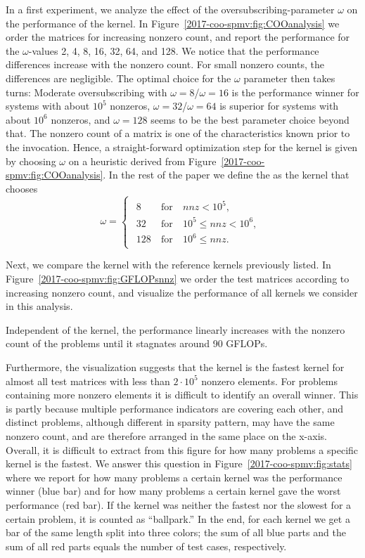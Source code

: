 In a first experiment, we analyze the effect of the oversubscribing-parameter $\omega$ 
on the performance of the \coo kernel.
In Figure~\ref{2017-coo-spmv:fig:COOanalysis} we order the matrices for increasing nonzero count, 
and report the performance for the $\omega$-values 2, 4, 8, 16, 32, 64, and 128.
We notice that the performance differences increase with the
nonzero count. For small nonzero counts, the differences are negligible. 
The optimal choice for the $\omega$ parameter then takes turns: 
Moderate oversubscribing with $\omega=8$/$\omega=16$ 
is the performance winner for systems with about $10^5$ nonzeros,
$\omega=32$/$\omega=64$ is superior for systems with about $10^6$ nonzeros,
and $\omega=128$ seems to be the best parameter choice beyond that.
The nonzero count of a matrix is one of the characteristics known prior
to the \spmv invocation. 
Hence, a straight-forward optimization step for the \coo kernel is given 
by choosing $\omega$ on a heuristic derived from Figure~\ref{2017-coo-spmv:fig:COOanalysis}.
In the rest of the paper we define the \coo as the kernel that chooses 
\[
\omega =
\begin{cases}
\begin{array}{lll}
8 & \mathrm{\ for\ } & nnz<10^5,\\
32 & \mathrm{\ for\ } & 10^5 \leq nnz<10^6,\\
128 & \mathrm{\ for\ }&10^6 \leq nnz.
\end{array}
\end{cases}
\]

Next, we compare the \coo kernel with the reference kernels previously listed. 
In Figure~\ref{2017-coo-spmv:fig:GFLOPsnnz} we order the test matrices according to increasing nonzero count,
and visualize the performance of all \spmv kernels we consider in this analysis. 

Independent of the \spmv kernel, the performance linearly increases with the nonzero count of the problems until it stagnates around 90 GFLOPs. 

Furthermore, the visualization suggests that the \coo kernel is the fastest kernel for almost 
all test matrices
with less than $2 \cdot 10^5$ nonzero elements. For problems containing more nonzero elements it
is difficult to identify an overall winner. This is partly because multiple
performance indicators are covering each other, and distinct problems, although different in
sparsity pattern, may have the same nonzero count, and are therefore arranged in the same place on the x-axis. 
Overall, it is difficult to extract from this figure for how many problems a specific kernel is the fastest. 
We answer this question in Figure~\ref{2017-coo-spmv:fig:stats} where we report for how many problems a certain kernel was the performance winner (blue bar) and for how many problems a certain kernel gave the worst performance (red bar). If the kernel was neither the fastest nor the slowest for a certain problem, it is counted as ``ballpark.'' In the end, for each kernel we get a bar of the same length split into three colors; the sum of all blue parts and the sum of all red parts equals the number of test cases, respectively.

